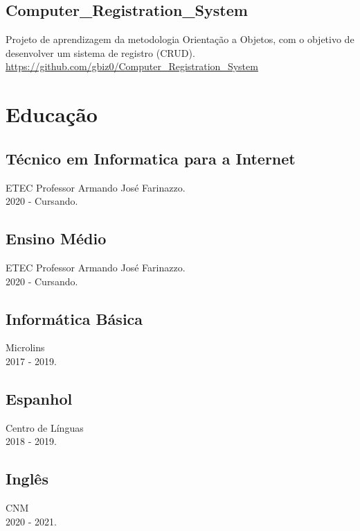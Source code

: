 \documentclass[16pt]{article}
\begin{document}
    \hfill\vline\hfill
    \begin{minipage}[t]{0.50\linewidth}
      \subsection{Computer_Registration_System}
        Projeto de aprendizagem da metodologia Orientação a Objetos, com o objetivo de desenvolver um sistema de registro (CRUD).\\

        \url{https://github.com/gbiz0/Computer_Registration_System}\\

    \end{minipage}
  \section{Educação}
    \begin{minipage}[t]{0.47\linewidth}
      \subsection{Técnico em Informatica para a Internet}
        ETEC Professor Armando José Farinazzo.\\
        2020 - Cursando.\\
      \subsection{Ensino Médio}
        ETEC Professor Armando José Farinazzo.\\
        2020 - Cursando.\\
    \end{minipage}
    \hfill\vline\hfill
    \begin{minipage}[t]{0.5\linewidth}
      \subsection{Informática Básica}
        Microlins\\
        2017 - 2019.\\
      \subsection{Espanhol}
        Centro de Línguas\\
        2018 - 2019.
      \subsection{Inglês}
        CNM\\
        2020 - 2021.
    \end{minipage}
\end{document}
